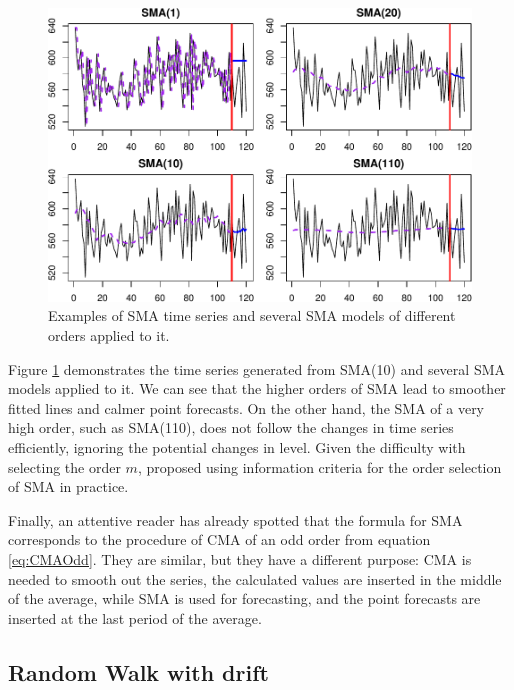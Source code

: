 \documentclass[
]{book}
\theoremstyle{definition}
\theoremstyle{definition}
\theoremstyle{definition}
\theoremstyle{definition}
\theoremstyle{remark}
\begin{document}
\begin{figure}
\centering
\includegraphics{Svetunkov--2022----ADAM_files/figure-latex/SMAExample-1.pdf}
\caption{\label{fig:SMAExample}Examples of SMA time series and several SMA models of different orders applied to it.}
\end{figure}

Figure \ref{fig:SMAExample} demonstrates the time series generated from SMA(10) and several SMA models applied to it. We can see that the higher orders of SMA lead to smoother fitted lines and calmer point forecasts. On the other hand, the SMA of a very high order, such as SMA(110), does not follow the changes in time series efficiently, ignoring the potential changes in level. Given the difficulty with selecting the order \(m\), \citet{Svetunkov2017} proposed using information criteria for the order selection of SMA in practice.

Finally, an attentive reader has already spotted that the formula for SMA corresponds to the procedure of CMA of an odd order from equation \eqref{eq:CMAOdd}. They are similar, but they have a different purpose: CMA is needed to smooth out the series, the calculated values are inserted in the middle of the average, while SMA is used for forecasting, and the point forecasts are inserted at the last period of the average.

\hypertarget{RWWithDrift}{%
\subsection{Random Walk with drift}\label{RWWithDrift}}
\end{document}
